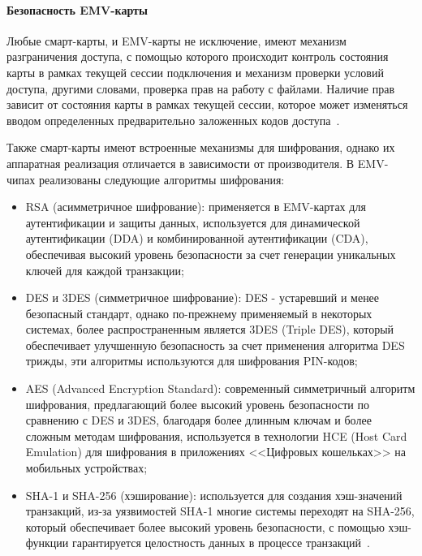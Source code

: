 \paragraph{Безопасность EMV-карты}

Любые смарт-карты, и EMV-карты не исключение, имеют механизм разграничения доступа, с помощью которого происходит контроль состояния карты в рамках текущей сессии подключения и механизм проверки условий доступа, другими словами, проверка прав на работу с файлами.
Наличие прав зависит от состояния карты в рамках текущей сессии, которое может изменяться вводом определенных предварительно заложенных кодов доступа~\cite{habr_smart_card_for_little}.

Также смарт-карты имеют встроенные механизмы для шифрования, однако их аппаратная реализация отличается в зависимости от производителя.
В EMV-чипах реализованы следующие алгоритмы шифрования:

\begin{itemize}
    \item RSA (асимметричное шифрование): применяется в EMV-картах для аутентификации и защиты данных, используется для динамической аутентификации (DDA) и комбинированной аутентификации (CDA), обеспечивая высокий уровень безопасности за счет генерации уникальных ключей для каждой транзакции;
    \item DES и 3DES (симметричное шифрование): DES - устаревший и менее безопасный стандарт, однако по-прежнему применяемый в некоторых системах, более распространенным является 3DES (Triple DES), который обеспечивает улучшенную безопасность за счет применения алгоритма DES трижды, эти алгоритмы используются для шифрования PIN-кодов;%
    \item AES (Advanced Encryption Standard): современный симметричный алгоритм шифрования, предлагающий более высокий уровень безопасности по сравнению с DES и 3DES, благодаря более длинным ключам и более сложным методам шифрования, используется в технологии HCE (Host Card Emulation) для шифрования в приложениях <<Цифровых кошельках>> на мобильных устройствах;
    \item SHA-1 и SHA-256 (хэширование): используется для создания хэш-значений транзакций, из-за уязвимостей SHA-1 многие системы переходят на SHA-256, который обеспечивает более высокий уровень безопасности, с помощью хэш-функции гарантируется целостность данных в процессе транзакций~\cite{emv_fastercapital}.
\end{itemize}

